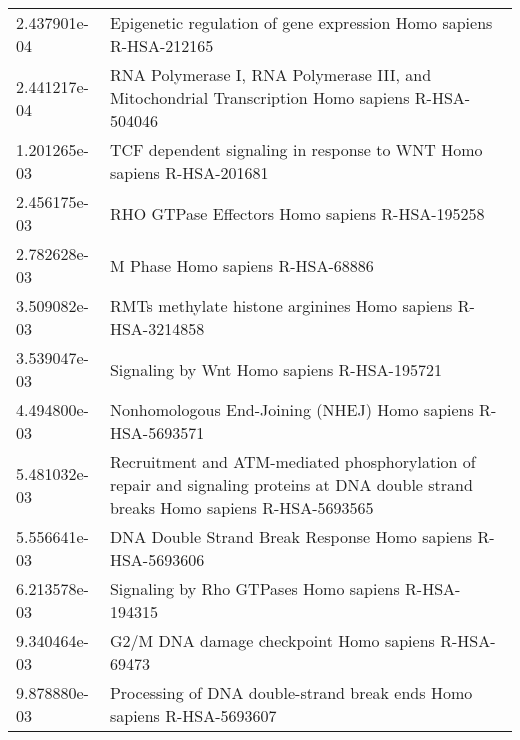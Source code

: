 \begin{longtable}{p{2.4cm}p{14.5cm}}
             2.437901e-04 &                                                                    Epigenetic regulation of gene expression Homo sapiens R-HSA-212165 \\
             2.441217e-04 &                                       RNA Polymerase I, RNA Polymerase III, and Mitochondrial Transcription Homo sapiens R-HSA-504046 \\
             1.201265e-03 &                                                                  TCF dependent signaling in response to WNT Homo sapiens R-HSA-201681 \\
             2.456175e-03 &                                                                                        RHO GTPase Effectors Homo sapiens R-HSA-195258 \\
             2.782628e-03 &                                                                                                      M Phase Homo sapiens R-HSA-68886 \\
             3.509082e-03 &                                                                           RMTs methylate histone arginines Homo sapiens R-HSA-3214858 \\
             3.539047e-03 &                                                                                            Signaling by Wnt Homo sapiens R-HSA-195721 \\
             4.494800e-03 &                                                                           Nonhomologous End-Joining (NHEJ) Homo sapiens R-HSA-5693571 \\
             5.481032e-03 &  Recruitment and ATM-mediated phosphorylation of repair and signaling proteins at DNA double strand breaks Homo sapiens R-HSA-5693565 \\
             5.556641e-03 &                                                                           DNA Double Strand Break Response Homo sapiens R-HSA-5693606 \\
             6.213578e-03 &                                                                                    Signaling by Rho GTPases Homo sapiens R-HSA-194315 \\
             9.340464e-03 &                                                                                   G2/M DNA damage checkpoint Homo sapiens R-HSA-69473 \\
             9.878880e-03 &                                                                 Processing of DNA double-strand break ends Homo sapiens R-HSA-5693607 \\

\end{longtable}
